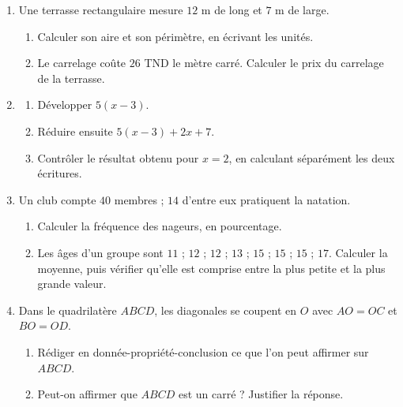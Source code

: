 \documentclass[10pt,a4paper]{article}
\begin{document}
\begin{enumerate}
\needspace{22mm}
\item[\textbf{B1.}] Une terrasse rectangulaire mesure $12$ m de long et $7$ m de large.
\begin{enumerate}
\item Calculer son aire et son périmètre, en écrivant les unités.
\item Le carrelage coûte $26$ TND le mètre carré. Calculer le prix du carrelage de la terrasse.
\end{enumerate}
\par\vspace{1.2mm}
\needspace{22mm}
\item[\textbf{B2.}] \begin{enumerate}
\item Développer $5(x - 3)$.
\item Réduire ensuite $5(x - 3) + 2x + 7$.
\item Contrôler le résultat obtenu pour $x = 2$, en calculant séparément les deux écritures.
\end{enumerate}
\par\vspace{1.2mm}
\needspace{22mm}
\item[\textbf{B3.}] Un club compte $40$ membres ; $14$ d'entre eux pratiquent la natation.
\begin{enumerate}
\item Calculer la fréquence des nageurs, en pourcentage.
\item Les âges d'un groupe sont $11$ ; $12$ ; $12$ ; $13$ ; $15$ ; $15$ ; $15$ ; $17$.
Calculer la moyenne, puis vérifier qu'elle est comprise entre la plus petite et la plus grande valeur.
\end{enumerate}
\par\vspace{1.2mm}
\needspace{22mm}
\item[\textbf{B4.}] Dans le quadrilatère $ABCD$, les diagonales se coupent en $O$ avec $AO = OC$ et $BO = OD$.
\begin{enumerate}
\item Rédiger en donnée-propriété-conclusion ce que l'on peut affirmer sur $ABCD$.
\item Peut-on affirmer que $ABCD$ est un carré ? Justifier la réponse.
\end{enumerate}
\par\vspace{1.2mm}
\end{enumerate}
\end{document}
